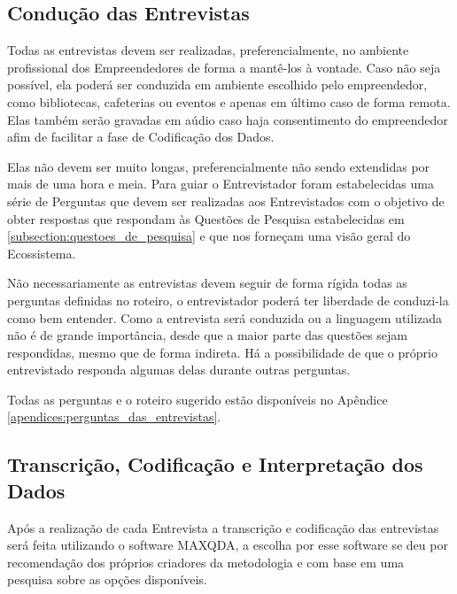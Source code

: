 \subsection{Condução das Entrevistas}
\label{subsection:conducao_das_entrevistas}

Todas as entrevistas devem ser realizadas, preferencialmente, no ambiente profissional dos Empreendedores de forma a mantê-los à vontade. Caso não seja possível, ela poderá ser conduzida em ambiente escolhido pelo empreendedor, como bibliotecas, cafeterias ou eventos e apenas em último caso de forma remota. Elas também serão gravadas em aúdio caso haja consentimento do empreendedor afim de facilitar a fase de Codificação dos Dados.

Elas não devem ser muito longas, preferencialmente não sendo extendidas por mais de uma hora e meia. Para guiar o Entrevistador foram estabelecidas uma série de Perguntas que devem ser realizadas aos Entrevistados com o objetivo de obter respostas que respondam às Questões de Pesquisa estabelecidas em \ref{subsection:questoes_de_pesquisa} e que nos forneçam uma visão geral do Ecossistema. 

Não necessariamente as entrevistas devem seguir de forma rígida todas as perguntas definidas no roteiro, o entrevistador poderá ter liberdade de conduzi-la como bem entender. Como a entrevista será conduzida ou a linguagem utilizada não é de grande importância, desde que a maior parte das questões sejam respondidas, mesmo que de forma indireta. Há a possibilidade de que o próprio entrevistado responda algumas delas durante outras perguntas. 

Todas as perguntas e o roteiro sugerido estão disponíveis no Apêndice \ref{apendices:perguntas_das_entrevistas}.

\subsection{Transcrição, Codificação e Interpretação dos Dados}
\label{subsection:codificacao_e_interpretacao_dos_dados}

Após a realização de cada Entrevista a transcrição e codificação das entrevistas será feita utilizando o software MAXQDA, a escolha por esse software se deu por recomendação dos próprios criadores da metodologia e com base em uma pesquisa sobre as opções disponíveis.